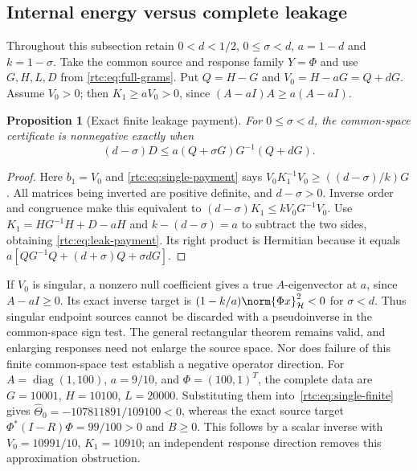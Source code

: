 \documentclass[11pt,a4paper]{article}
\numberwithin{equation}{section}
\newtheorem{proposition}[theorem]{Proposition}
\theoremstyle{definition}\newtheorem{definition}[theorem]{Definition}
\theoremstyle{remark}\newtheorem{remark}[theorem]{Remark}
\newcommand{\Hh}{\mathcal H}\newcommand{\Hw}{\mathcal H}
\begin{document}
\subsection{Internal energy versus complete leakage}\label{rtc:sec:leakage}
Throughout this subsection retain $0<d<1/2$, $0\le\sigma<d$,
$a=1-d$ and $k=1-\sigma$. Take the common source and response family
$Y=\Phi$ and use $G,H,L,D$ from \eqref{rtc:eq:full-grams}. Put
$Q=H-G$ and $V_0=H-aG=Q+dG$. Assume $V_0>0$; then
$K_1\ge aV_0>0$, since $(A-aI)A\ge a(A-aI)$.
\begin{proposition}[Exact finite leakage payment]\label{rtc:prop:payment}
For $0\le\sigma<d$, the common-space certificate is nonnegative exactly
when
\begin{equation}\label{rtc:eq:leak-payment}
 (d-\sigma)D\le a(Q+\sigma G)G^{-1}(Q+dG).
\end{equation}
\end{proposition}
\begin{proof}
Here $b_1=V_0$ and \eqref{rtc:eq:single-payment} says
$V_0K_1^{-1}V_0\ge((d-\sigma)/k)G$.
All matrices being inverted are positive definite, and $d-\sigma>0$.
Inverse order and congruence make this equivalent to
$(d-\sigma)K_1\le kV_0G^{-1}V_0$.
Use $K_1=HG^{-1}H+D-aH$ and $k-(d-\sigma)=a$ to subtract the two
sides, obtaining \eqref{rtc:eq:leak-payment}.
Its right product is Hermitian because it equals
$a[QG^{-1}Q+(d+\sigma)Q+\sigma dG]$.
\end{proof}
If $V_0$ is singular, a nonzero null coefficient gives a true
$A$-eigenvector at $a$, since $A-aI\ge0$. Its exact inverse target is
$(1-k/a)\norm{\Phi x}_{\Hh}^2<0$ for $\sigma<d$.
Thus singular endpoint sources cannot be discarded with a pseudoinverse
in the common-space sign test. The general rectangular theorem remains
valid, and enlarging responses need not enlarge the source space.
Nor does failure of this finite common-space test establish a negative
operator direction. For $A=\operatorname{diag}(1,100)$, $a=9/10$,
and $\Phi=(100,1)^T$, the complete data are
$G=10001$, $H=10100$, $L=20000$.
Substituting them into~\eqref{rtc:eq:single-finite} gives
$\widehat\Theta_0=-107811891/109100<0$, whereas the exact source target
$\Phi^*(I-R)\Phi=99/100>0$ and $B\ge0$.
This follows by a scalar inverse with $V_0=10991/10$, $K_1=10910$;
an independent response direction removes this approximation obstruction.
\end{document}
